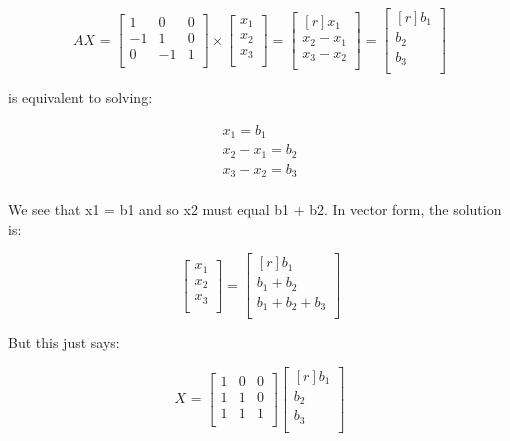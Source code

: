 \documentclass{article}
\begin{document}
 
\[
  AX_{} = 
  \begin{bmatrix}
    1 & 0 & 0\\
    -1& 1 & 0\\
    0 & -1 & 1\\
  \end{bmatrix}
  \times
  \begin{bmatrix}
   x_1\\
    x_2\\
    x_3\\ 
  \end{bmatrix}
  =
   \begin{bmatrix*}[r]
    x_1\\
    x_2-x_1\\
    x_3-x_2\\ 
  \end{bmatrix*}
  =
   \begin{bmatrix*}[r]
    b_1\\
    b_2\\
    b_3\\ 
  \end{bmatrix*}
\]

is equivalent to solving: 
\begin{center}
\begin{align}
    x_1 = b_1\nonumber\\
    x_2-x_1 = b_2\nonumber\\
    x_3-x_2 = b_3\nonumber\\
    \nonumber
\end{align}
\end{center}
We see that x1 = b1 and so x2 must equal b1 + b2. In vector form, the solution
is: 

\[
  _{}  
  \begin{bmatrix}
    x_1\\
    x_2\\
    x_3\\
  \end{bmatrix}
  =
   \begin{bmatrix*}[r]
    b_1\\
    b_1+b_2\\
    b_1+b_2+b_3\\ 
  \end{bmatrix*}
\]

But this just says: 


\[
  X_{}=  
  \begin{bmatrix}
    1 & 0 & 0\\
    1 & 1 & 0\\
    1 & 1 & 1\\
  \end{bmatrix}
   \begin{bmatrix*}[r]
    b_1\\
    b_2\\
    b_3\\ 
  \end{bmatrix*}
\]
\end{document}

